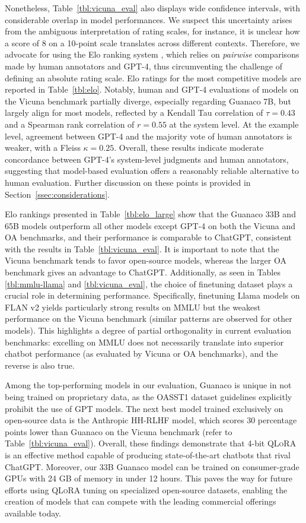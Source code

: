 Nonetheless, Table~\ref{tbl:vicuna_eval} also displays wide confidence intervals, with considerable overlap in model performances. We suspect this uncertainty arises from the ambiguous interpretation of rating scales, for instance, it is unclear how a score of 8 on a 10-point scale translates across different contexts. Therefore, we advocate for using the Elo ranking system \citep{elo1967proposed}, which relies on \textit{pairwise} comparisons made by human annotators and GPT-4, thus circumventing the challenge of defining an absolute rating scale. Elo ratings for the most competitive models are reported in Table~\ref{tbl:elo}. Notably, human and GPT-4 evaluations of models on the Vicuna benchmark partially diverge, especially regarding Guanaco 7B, but largely align for most models, reflected by a Kendall Tau correlation of $\tau=0.43$ and a Spearman rank correlation of $r=0.55$ at the system level. At the example level, agreement between GPT-4 and the majority vote of human annotators is weaker, with a Fleiss $\kappa=0.25$. Overall, these results indicate moderate concordance between GPT-4’s system-level judgments and human annotators, suggesting that model-based evaluation offers a reasonably reliable alternative to human evaluation. Further discussion on these points is provided in Section~\ref{ssec:considerations}.

Elo rankings presented in Table~\ref{tbl:elo_large} show that the {Guanaco} 33B and 65B models outperform all other models except GPT-4 on both the Vicuna and OA benchmarks, and their performance is comparable to ChatGPT, consistent with the results in Table~\ref{tbl:vicuna_eval}. It is important to note that the Vicuna benchmark tends to favor open-source models, whereas the larger OA benchmark gives an advantage to ChatGPT. Additionally, as seen in Tables \ref{tbl:mmlu-llama} and \ref{tbl:vicuna_eval}, the choice of finetuning dataset plays a crucial role in determining performance. Specifically, finetuning Llama models on FLAN v2 yields particularly strong results on MMLU but the weakest performance on the Vicuna benchmark (similar patterns are observed for other models). This highlights a degree of partial orthogonality in current evaluation benchmarks: excelling on MMLU does not necessarily translate into superior chatbot performance (as evaluated by Vicuna or OA benchmarks), and the reverse is also true.

Among the top-performing models in our evaluation, {Guanaco} is unique in not being trained on proprietary data, as the OASST1 dataset guidelines explicitly prohibit the use of GPT models. The next best model trained exclusively on open-source data is the Anthropic HH-RLHF model, which scores 30 percentage points lower than {Guanaco} on the Vicuna benchmark (refer to Table~\ref{tbl:vicuna_eval}). Overall, these findings demonstrate that 4-bit \textsc{QLoRA} is an effective method capable of producing state-of-the-art chatbots that rival ChatGPT. Moreover, our 33B {Guanaco} model can be trained on consumer-grade GPUs with 24 GB of memory in under 12 hours. This paves the way for future efforts using \textsc{QLoRA} tuning on specialized open-source datasets, enabling the creation of models that can compete with the leading commercial offerings available today.

